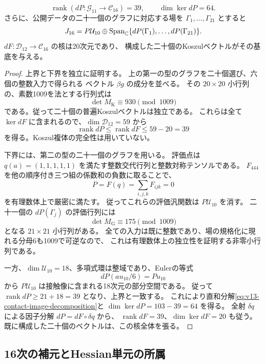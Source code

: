 \begin{proposition}[16次の普遍接触階数]
\label{prop:v13-contact-rank-sixteenth}
\[
 \operatorname{rank}(dP:\mathcal G_{11}\to\mathcal C_{16})=39,
 \qquad \dim\ker dP=64.
\]
さらに、公開データの二十一個のグラフに対応する場を
$\Gamma_1,\ldots,\Gamma_{21}$ とすると
\begin{equation}\label{eq:v13-contact-image-decomposition}
 J_{16}=P\mathcal U_{10}
       \oplus\operatorname{Span}_{\mathbb C}\{dP(\Gamma_1),\ldots,dP(\Gamma_{21})\}.
\end{equation}
$dF:\mathcal D_{12}\to\mathcal C_{16}$ の核は20次元であり、
構成した二十個のKoszulベクトルがその基底を与える。
\end{proposition}
\begin{proof}
上界と下界を独立に証明する。
上の第一の型のグラフを二十個選び、六個の整数入力で得られる
ベクトル $\beta g$ の成分を並べる。
その $20\times20$ 小行列の、素数1009を法とする行列式は
\[
 \det M_{\mathrm K}\equiv930\pmod{1009}
\]
である。従って二十個の普遍Koszulベクトルは独立である。
これらは全て $\ker dF$ に含まれるので、$\dim\mathcal D_{12}=59$ から
\[
 \operatorname{rank}dP\le\operatorname{rank}dF\le59-20=39
\]
を得る。Koszul複体の完全性は用いていない。

下界には、第二の型の二十一個のグラフを用いる。
評価点は $q(a)=(1,1,1,1,1)$ を満たす整数交代行列と整数対称テンソルである。
$F_{444}$ を他の順序付き三つ組の係数和の負数に取ることで、
\[
 P=F(q)=\sum_{i,j,k}F_{ijk}=0
\]
を有理数体上で厳密に満たす。
従ってこれらの評価汎関数は $P\mathcal U_{10}$ を消す。
二十一個の $dP(\Gamma_j)$ の評価行列には
\[
 \det M_{\mathrm G}\equiv175\pmod{1009}
\]
となる $21\times21$ 小行列がある。
全ての入力は既に整数であり、場の規格化に現れる分母6も1009で可逆なので、
これは有理数体上の独立性を証明する非零小行列である。

一方、$\dim\mathcal U_{10}=18$、多項式環は整域であり、Eulerの等式
\[
 dP(au_{10}/6)=Pu_{10}
\]
から $P\mathcal U_{10}$ は接触像に含まれる18次元の部分空間である。
従って $\operatorname{rank}dP\ge21+18=39$ となり、上界と一致する。
これにより直和分解\eqref{eq:v13-contact-image-decomposition}と
$\dim\ker dP=103-39=64$ を得る。
全射 $\delta q$ による因子分解 $dP=dF\circ\delta q$ から、
$\operatorname{rank}dF=39$、$\dim\ker dF=20$ も従う。
既に構成した二十個のベクトルは、この核全体を張る。
\end{proof}

\subsection{16次の補元とHessian単元の所属}
\label{subsec:v13-sixteenth-complement}

